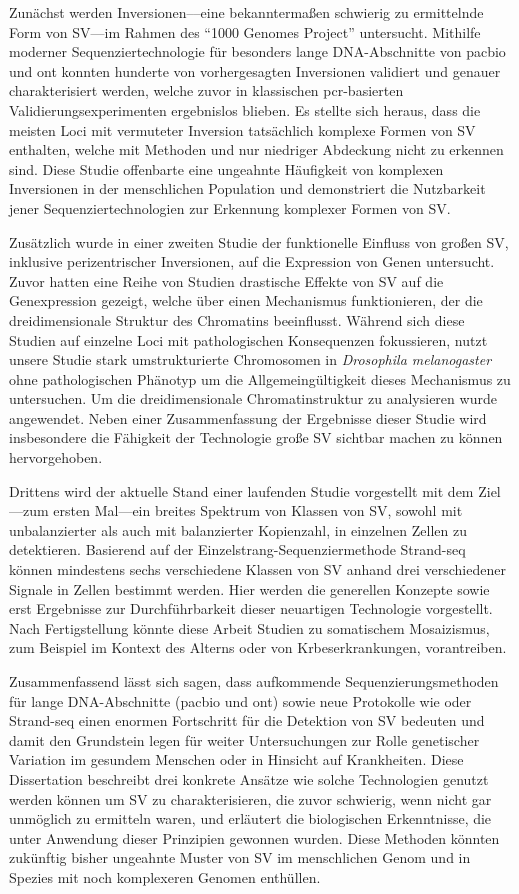 Zunächst werden Inversionen--–eine bekanntermaßen schwierig zu ermittelnde Form
von SV---im Rahmen des ``1000 Genomes Project'' untersucht. Mithilfe moderner
Sequenziertechnologie für besonders lange DNA\--Ab\-schnit\-te von \acl{pacbio}
und \acl{ont} konnten hunderte von vor\-her\-ge\-sag\-ten Inversionen validiert und
genauer cha\-rak\-te\-ri\-siert werden, welche zuvor in klassischen \acs{pcr}-basierten
Validierungsexperimenten ergebnislos blieben. Es stellte sich heraus, dass die
meis\-ten Loci mit vermuteter Inversion tatsächlich komplexe Formen von SV
enthalten, welche mit \mps Methoden und nur niedriger Abdeckung nicht zu
erkennen sind. Diese Studie offenbarte eine ungeahnte Häufigkeit von komplexen
Inversionen in der menschlichen Population und demonstriert die Nutzbarkeit
jener Sequenziertechnologien zur Erkennung komplexer Formen von SV.

Zusätzlich wurde in einer zweiten Studie der funktionelle Einfluss von großen SV,
inklusive perizentrischer Inversionen, auf die Expression von Genen untersucht.
Zuvor hatten eine Reihe von Studien drastische Effekte von SV auf die
Genexpression gezeigt, welche über einen Mechanismus funktionieren, der die
dreidimensionale Struktur des Chromatins beeinflusst. Während sich diese Studien
auf einzelne Loci mit pathologischen Konsequenzen fokussieren, nutzt unsere
Studie stark umstrukturierte Chromosomen in \textit{Drosophila melanogaster}
ohne pathologischen Phänotyp um die Allgemeingültigkeit dieses Mechanismus zu
untersuchen. Um die dreidimensionale Chromatinstruktur zu analysieren wurde \hic
angewendet. Neben einer Zusammenfassung der Ergebnisse dieser Studie wird
insbesondere die Fähigkeit der \hic Technologie große SV sichtbar machen zu
können hervorgehoben.

Drittens wird der aktuelle Stand einer laufenden Studie vorgestellt mit dem
Ziel---zum ersten Mal---ein breites Spektrum von Klassen von SV, sowohl mit unbalanzierter
als auch mit balanzierter Kopienzahl, in einzelnen Zellen zu detektieren.
Basierend auf der Ein\-zel\-strang-Se\-quen\-zier\-me\-tho\-de Strand-seq können
mindestens sechs verschiedene Klas\-sen von SV anhand drei verschiedener Signale
in Zellen bestimmt werden. Hier werden die generellen Konzepte sowie erst
Ergebnisse zur Durchführbarkeit dieser neuartigen Technologie
vorgestellt. Nach Fertigstellung könnte diese Arbeit Studien zu somatischem
Mosaizismus, zum Beispiel im Kontext des Alterns oder von Krbeserkrankungen,
vorantreiben.

Zusammenfassend lässt sich sagen, dass aufkommende Sequenzierungsmethoden für
lange DNA-Ab\-schnit\-te (\acl{pacbio} und \acl{ont}) sowie neue Protokolle wie
\hic oder Strand-seq einen enormen Fortschritt für die Detektion von SV bedeuten
und damit den Grundstein legen für weiter Untersuchungen zur Rolle genetischer
Variation im gesundem Menschen oder in Hinsicht auf Krankheiten. Diese
Dissertation beschreibt drei konkrete Ansätze wie solche Technologien genutzt
werden können um SV zu charakterisieren, die zuvor schwierig, wenn nicht gar
unmöglich zu ermitteln waren, und erläutert die biologischen Erkenntnisse, die
unter Anwendung dieser Prinzipien gewonnen wurden. Diese Methoden könnten
zukünftig bisher ungeahnte Muster von SV im menschlichen Genom und in Spezies
mit noch komplexeren Genomen enthüllen.

